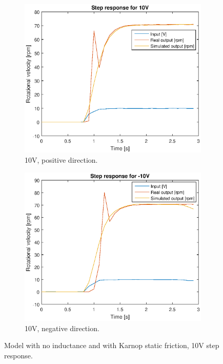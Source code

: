 \begin{figure}[H]
    \centering
    \begin{subfigure}[H]{0.48\textwidth}
    \includegraphics[width=\textwidth]{./img/testrig_10Vstep_no_i_fric.eps}
    \caption{10V, positive direction.}
    \label{fig:step102}
    \end{subfigure}
    \begin{subfigure}[H]{0.48\textwidth}
    \includegraphics[width=\textwidth]{./img/testrig_m10Vstep_no_i_fric.eps}
    \caption{10V, negative direction.}
    \label{fig:stepm102}
    \end{subfigure}
    \caption{Model with no inductance and with Karnop static friction, 10V step response.}
\end{figure}
